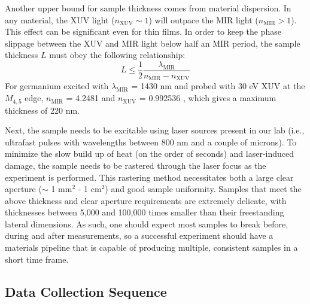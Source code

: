 Another upper bound for sample thickness comes from material dispersion. In any material, the XUV light ($n_{\text{XUV}} \sim 1$) will outpace the MIR light ($n_{\text{MIR}} > 1$). This effect can be significant even for thin films. In order to keep the phase slippage between the XUV and MIR light below half an MIR period, the sample thickness $L$ must obey the following relationship:
\begin{equation}
L \le \frac{1}{2} \frac{\lambda_{\text{MIR}}}{n_{\text{MIR}} - n_{\text{XUV}}}
\end{equation}
For germanium excited with $\lambda_{\text{MIR}}$ = 1430 nm and probed with 30 eV XUV at the $M_{4,5}$ edge, $n_{\text{MIR}}$ = 4.2481 \cite{nunleyOpticalConstantsGermanium2016} and $n_{\text{XUV}}$ = 0.992536 \cite{gulliksonCXROXRayInteractions}, which gives a maximum thickness of 220 nm.

Next, the sample needs to be excitable using laser sources present in our lab (i.e., ultrafast pulses with wavelengths between 800 nm and a couple of microns). To minimize the slow build up of heat (on the order of seconds) and laser-induced damage, the sample needs to be rastered through the laser focus as the experiment is performed. This rastering method necessitates both a large clear aperture ($\sim$ 1 mm$^2$ - 1 cm$^2$) and good sample uniformity. Samples that meet the above thickness and clear aperture requirements are extremely delicate, with thicknesses between 5,000 and 100,000 times smaller than their freestanding lateral dimensions. As such, one should expect most samples to break before, during and after measurements, so a successful experiment should have a materials pipeline that is capable of producing multiple, consistent samples in a short time frame.

\subsection{Data Collection Sequence}
\label{sec:data_collection_sequence}

